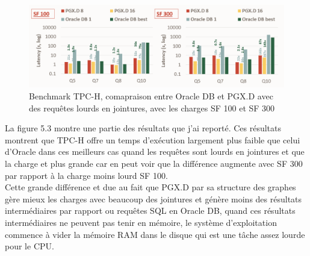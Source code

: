 \begin{figure}[H]  
  \centering
    \includegraphics[width=1.15\textwidth]{chapitre5/Figures/TPC-H.PNG}
  \caption{Benchmark TPC-H, comapraison entre Oracle DB et PGX.D avec des requêtes lourds en jointures, avec les charges SF 100 et SF 300}
\end{figure}

La figure 5.3 montre une partie des résultats que j’ai reporté. Ces résultats montrent que TPC-H offre un temps d’exécution largement plus faible que celui d’Oracle dans ces meilleurs cas quand les requêtes sont lourds en jointures et que la charge et plus grande car en peut voir que la différence augmente avec SF 300 par rapport à la charge moins lourd SF 100.\\
Cette grande différence et due au fait que PGX.D par sa structure des graphes gère mieux les charges avec beaucoup des jointures et génère moins des résultats intermédiaires par rapport ou requêtes SQL en Oracle DB, quand ces résultats intermédiaires ne peuvent pas tenir en mémoire, le système d’exploitation commence à vider la mémoire RAM dans le disque qui est une tâche assez lourde pour le CPU.